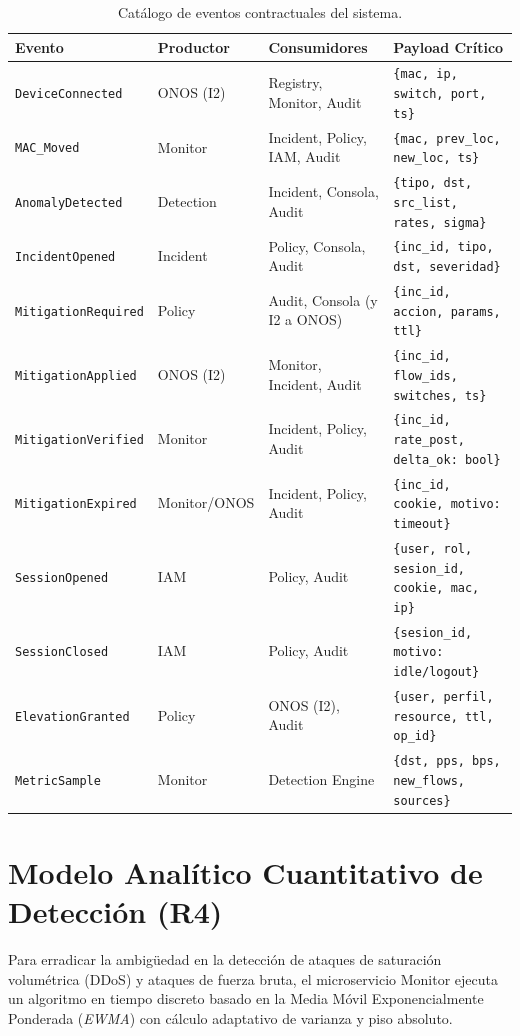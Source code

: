 \documentclass[11pt,a4paper]{report}
\begin{document}
\begin{table}[h!]
\centering
\small
\begin{tabularx}{\linewidth}{p{3.2cm}p{2.2cm}p{3.2cm}X}
\toprule
\textbf{Evento} & \textbf{Productor} & \textbf{Consumidores} & \textbf{Payload Crítico} \\
\midrule
\texttt{DeviceConnected} & ONOS (I2) & Registry, Monitor, Audit & \texttt{\{mac, ip, switch, port, ts\}} \\
\texttt{MAC\_Moved} & Monitor & Incident, Policy, IAM, Audit & \texttt{\{mac, prev\_loc, new\_loc, ts\}} \\
\texttt{AnomalyDetected} & Detection & Incident, Consola, Audit & \texttt{\{tipo, dst, src\_list, rates, sigma\}} \\
\texttt{IncidentOpened} & Incident & Policy, Consola, Audit & \texttt{\{inc\_id, tipo, dst, severidad\}} \\
\texttt{MitigationRequired} & Policy & Audit, Consola (y I2 a ONOS) & \texttt{\{inc\_id, accion, params, ttl\}} \\
\texttt{MitigationApplied} & ONOS (I2) & Monitor, Incident, Audit & \texttt{\{inc\_id, flow\_ids, switches, ts\}} \\
\texttt{MitigationVerified} & Monitor & Incident, Policy, Audit & \texttt{\{inc\_id, rate\_post, delta\_ok: bool\}} \\
\texttt{MitigationExpired} & Monitor/ONOS & Incident, Policy, Audit & \texttt{\{inc\_id, cookie, motivo: timeout\}} \\
\texttt{SessionOpened} & IAM & Policy, Audit & \texttt{\{user, rol, sesion\_id, cookie, mac, ip\}} \\
\texttt{SessionClosed} & IAM & Policy, Audit & \texttt{\{sesion\_id, motivo: idle/logout\}} \\
\texttt{ElevationGranted} & Policy & ONOS (I2), Audit & \texttt{\{user, perfil, resource, ttl, op\_id\}} \\
\texttt{MetricSample} & Monitor & Detection Engine & \texttt{\{dst, pps, bps, new\_flows, sources\}} \\
\bottomrule
\end{tabularx}
\caption{Catálogo de eventos contractuales del sistema.}
\label{tab:eventos}
\end{table}

\section{Modelo Analítico Cuantitativo de Detección (R4)}
Para erradicar la ambigüedad en la detección de ataques de saturación volumétrica (DDoS) y ataques de fuerza bruta, el microservicio Monitor ejecuta un algoritmo en tiempo discreto basado en la Media Móvil Exponencialmente Ponderada (\emph{EWMA}) con cálculo adaptativo de varianza y piso absoluto.
\end{document}

